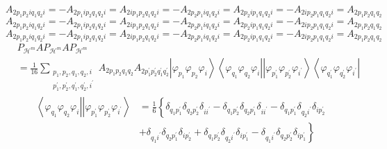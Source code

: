 \documentclass[aps,preprint]{revtex4}%
\begin{document}
\begin{equation}
A_{2p_{1}p_{2}iq_{1}q_{2}i}=-A_{2p_{1}ip_{2}q_{1}q_{2}i}=A_{2ip_{1}p_{2}%
q_{1}q_{2}i}=-A_{2p_{2}p_{1}iq_{1}q_{2}i}=A_{2p_{2}ip_{1}q_{1}q_{2}%
i}=-A_{2ip_{2}p_{1}q_{1}q_{2}i}=A_{2p_{1}p_{2}q_{1}q_{2}}%
\end{equation}%
\begin{equation}
A_{2p_{1}p_{2}iq_{1}q_{2}i}=-A_{2p_{1}ip_{2}q_{1}q_{2}i}=A_{2ip_{1}p_{2}%
q_{1}q_{2}i}=-A_{2p_{2}p_{1}iq_{1}q_{2}i}=A_{2p_{2}ip_{1}q_{1}q_{2}%
i}=-A_{2ip_{2}p_{1}q_{1}q_{2}i}=A_{2p_{1}p_{2}q_{1}q_{2}}%
\end{equation}%
\begin{equation}
A_{2p_{1}p_{2}iq_{1}q_{2}i}=-A_{2p_{1}ip_{2}q_{1}q_{2}i}=A_{2ip_{1}p_{2}%
q_{1}q_{2}i}=-A_{2p_{2}p_{1}iq_{1}q_{2}i}=A_{2p_{2}ip_{1}q_{1}q_{2}%
i}=-A_{2ip_{2}p_{1}q_{1}q_{2}i}=A_{2p_{1}p_{2}q_{1}q_{2}}%
\end{equation}%
\begin{align}
& P_{\mathcal{H}^{m}}AP_{\mathcal{H}^{m}}AP_{\mathcal{H}^{m}}\nonumber\\
& =\frac{1}{16}\sum_{\substack{p_{1},p_{2},q_{1},q_{2},i\\p_{1}^{\prime}%
,p_{2}^{\prime},q_{1}^{\prime},q_{2}^{\prime},i^{\prime}}}A_{2p_{1}p_{2}%
q_{1}q_{2}}A_{2p_{1}^{\prime}p_{2}^{\prime}q_{1}^{\prime}q_{2}^{\prime}%
}\left\vert \varphi_{p_{1}}\varphi_{p_{2}}\varphi_{i}\right\rangle
\left\langle \varphi_{q_{1}}\varphi_{q_{2}}\varphi_{i}\right\vert \left\vert
\varphi_{p_{1}^{\prime}}\varphi_{p_{2}^{\prime}}\varphi_{i^{\prime}%
}\right\rangle \left\langle \varphi_{q_{1}^{\prime}}\varphi_{q_{2}^{\prime}%
}\varphi_{i^{\prime}}\right\vert
\end{align}%
\begin{align}
\left\langle \varphi_{q_{1}}\varphi_{q_{2}}\varphi_{i}\right\vert \left\vert
\varphi_{p_{1}^{\prime}}\varphi_{p_{2}^{\prime}}\varphi_{i^{\prime}%
}\right\rangle  &  =\frac{1}{6}\left\{  \delta_{q_{1}p_{1}^{\prime}}%
\delta_{q_{2}p_{2}^{\prime}}\delta_{ii^{\prime}}-\delta_{q_{1}p_{2}^{\prime}%
}\delta_{q_{2}p_{1}^{\prime}}\delta_{ii^{\prime}}-\delta_{q_{1}p_{1}^{\prime}%
}\delta_{q_{2}i^{\prime}}\delta_{ip_{2}^{\prime}}\right.  \nonumber\\
&  +\left.  \delta_{q_{1}i^{\prime}}\delta_{q_{2}p_{1}^{\prime}}\delta
_{ip_{2}^{\prime}}+\delta_{q_{1}p_{2}^{\prime}}\delta_{q_{2}i^{\prime}}%
\delta_{ip_{1}^{\prime}}-\delta_{q_{1}i^{\prime}}\delta_{q_{2}p_{2}^{\prime}%
}\delta_{ip_{1}^{\prime}}\right\}
\end{align}%
\end{document}
